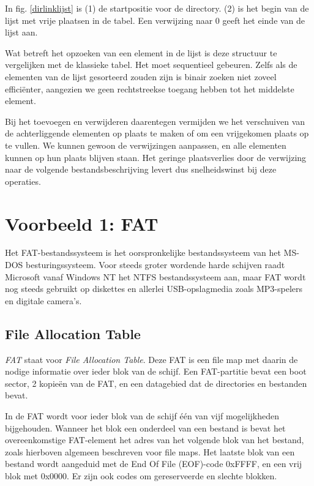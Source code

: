 In fig. \ref{dirlinklijst} is (1) de startpositie voor de directory. (2) is het begin van de lijst met vrije plaatsen in de tabel. Een verwijzing naar 0 geeft het einde van de lijst aan.

Wat betreft het opzoeken van een element in de lijst is deze
structuur te vergelijken met de klassieke tabel. Het moet sequentieel
gebeuren. Zelfs als de elementen van de lijst gesorteerd zouden zijn
is binair zoeken niet zoveel effici\"enter, aangezien we geen
rechtstreekse toegang hebben tot het middelste element.

Bij het toevoegen en verwijderen daarentegen vermijden we het
verschuiven van de achterliggende elementen op plaats te maken of om
een vrijgekomen plaats op te vullen. We kunnen gewoon de verwijzingen
aanpassen, en alle elementen kunnen op hun plaats blijven staan. Het
geringe plaatsverlies door de verwijzing naar de volgende
bestandsbeschrijving levert dus snelheidswinst bij deze
operaties.

\section{Voorbeeld 1: FAT}

Het FAT-bestandssysteem is het oorspronkelijke bestandssysteem van
het MS-DOS besturingssysteem. Voor steeds groter wordende harde schijven
raadt Microsoft vanaf Windows NT het NTFS bestandssysteem aan, maar FAT
wordt nog steeds gebruikt op diskettes en allerlei USB-opslagmedia zoals
MP3-spelers en digitale camera's.

\subsection{File Allocation Table}

\emph{FAT} staat voor \emph{File Allocation
Table}. Deze FAT is een file map met daarin de nodige
informatie over ieder blok van de schijf. Een FAT-partitie bevat een
boot sector, 2 kopie\"en van de FAT, en een datagebied dat de
directories en bestanden bevat.

In de FAT wordt voor ieder blok van de schijf \'e\'en van vijf
mogelijkheden bijgehouden. Wanneer het blok een onderdeel van een
bestand is bevat het overeenkomstige FAT-element het adres van het
volgende blok van het bestand, zoals hierboven algemeen beschreven
voor file maps. Het laatste blok van een bestand wordt aangeduid met
de End Of File (EOF)-code 0xFFFF, en een vrij blok met 0x0000. Er zijn
ook codes om gereserveerde en slechte blokken.

